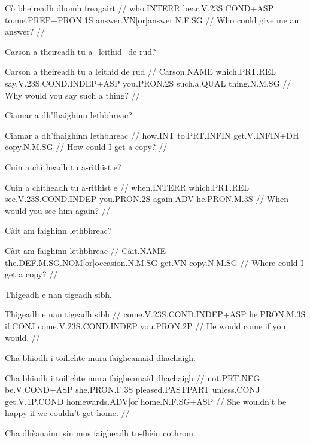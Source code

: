 \documentclass[a4paper,10pt]{article}
\begin{document}
\vspace{4mm}
\gla Cò bheireadh dhomh freagairt  //
\glb who.INTERR bear.V.23S.COND+ASP to.me.PREP+PRON.1S answer.VN[or]answer.N.F.SG  //
\glft Who could give me an answer? //
\endgl
\xe

\ex
\begingl
\glpre Carson a theireadh tu a\_leithid\_de rud? 

\vspace{4mm}
\gla Carson a theireadh tu {a leithid de} rud  //
\glb Carson.NAME which.PRT.REL say.V.23S.COND.INDEP+ASP you.PRON.2S such.a.QUAL thing.N.M.SG  //
\glft Why would you say such a thing? //
\endgl
\xe

\ex
\begingl
\glpre Ciamar a dh'fhaighinn lethbhreac? 

\vspace{4mm}
\gla Ciamar a dh'fhaighinn lethbhreac  //
\glb how.INT to.PRT.INFIN get.V.INFIN+DH copy.N.M.SG  //
\glft How could I get a copy? //
\endgl
\xe

\ex
\begingl
\glpre Cuin a chìtheadh tu a-rithist e? 

\vspace{4mm}
\gla Cuin a chìtheadh tu a-rithist e  //
\glb when.INTERR which.PRT.REL see.V.23S.COND.INDEP you.PRON.2S again.ADV he.PRON.M.3S  //
\glft When would you see him again? //
\endgl
\xe

\ex
\begingl
\glpre Càit am faighinn lethbhreac? 

\vspace{4mm}
\gla Càit am faighinn lethbhreac  //
\glb Càit.NAME the.DEF.M.SG.NOM[or]occasion.N.M.SG get.VN copy.N.M.SG  //
\glft Where could I get a copy? //
\endgl
\xe

\ex
\begingl
\glpre Thigeadh e nan tigeadh sibh. 

\vspace{4mm}
\gla Thigeadh e nan tigeadh sibh  //
\glb come.V.23S.COND.INDEP+ASP he.PRON.M.3S if.CONJ come.V.23S.COND.INDEP you.PRON.2P  //
\glft He would come if you would. //
\endgl
\xe

\ex
\begingl
\glpre Cha bhiodh i toilichte mura faigheamaid dhachaigh. 

\vspace{4mm}
\gla Cha bhiodh i toilichte mura faigheamaid dhachaigh  //
\glb not.PRT.NEG be.V.COND+ASP she.PRON.F.3S pleased.PASTPART unless.CONJ get.V.1P.COND homewards.ADV[or]home.N.F.SG+ASP  //
\glft She wouldn't be happy if we couldn't get home. //
\endgl
\xe

\ex
\begingl
\glpre Cha dhèanainn sin mus faigheadh tu-fhèin cothrom. 
\end{document}
